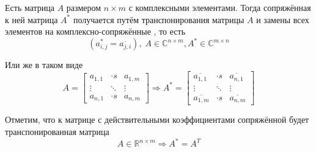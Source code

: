 \begin{definition}
  Есть матрица $A$ размером $n \times m$ с комплексными элементами.
  Тогда сопряжённая к ней матрица $A^*$ получается путём транспонирования
  матрицы $A$ и замены всех элементов на комплексно-сопряжённые
  \cite[с.~243]{VoevodinLA}, то есть
  $$\left( a_{i,j}^* = \overline{a_{j,i}} \right),\;
  A \in \mathbb{C}^{n \times m}, A^* \in \mathbb{C}^{m \times n}$$

  Или же в таком виде
  $$A =
  \begin{bmatrix}
      a_{1,1} & \cdot s & a_{1,m} \\
      \vdots & \ddots & \vdots \\
      a_{n,1} & \cdot s & a_{n,m}
  \end{bmatrix}
      \Rightarrow
  A^* = 
  \begin{bmatrix}
      \overline{a_{1,1}} & \cdot s & \overline{a_{n,1}} \\
      \vdots & \ddots & \vdots \\
      \overline{a_{1,m}} & \cdot s & \overline{a_{n,m}}
  \end{bmatrix}$$
\end{definition}

\begin{remark}
  Отметим, что к матрице с действительными коэффициентами сопряжённой будет
  транспонированная матрица
  $$A \in \mathbb{R}^{n \times m} \Rightarrow A^* = A^T$$
\end{remark}


